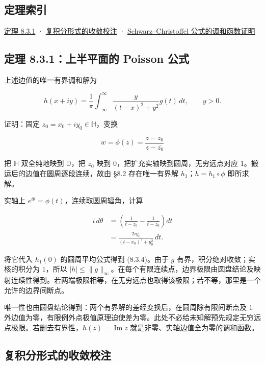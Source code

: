\documentclass[11pt,a4paper]{article}
\begin{document}
\subsection*{定理索引}\label{ch08-s3-heading-1}

\hyperref[ch08-s3-heading-2]{定理 8.3.1} ·
\hyperref[ch08-s3-heading-3]{复积分形式的收敛校注} ·
\hyperref[ch08-s3-heading-4]{Schwarz--Christoffel 公式的调和函数证明}

\subsection{定理 8.3.1：上半平面的 Poisson 公式}\label{ch08-s3-heading-2}

上述边值的唯一有界调和解为

\[
h(x+iy)=\frac1\pi\int_{-\infty}^{\infty}\frac{y}{(t-x)^2+y^2}g(t)\,dt,
\qquad y>0.\tag{8.3.4}
\]

证明：固定 \(z_0=x_0+iy_0\in\mathbb H\)，变换

\[
w=\phi(z)=\frac{z-z_0}{z-\overline{z_0}}\tag{8.3.A}
\]

把 \(\mathbb H\) 双全纯地映到 \(\mathbb D\)，把 \(z_0\) 映到
\(0\)，把扩充实轴映到圆周，无穷远点对应
\(1\)。搬运后的边值在圆周逐段连续，故由 §8.2 存在唯一有界解
\(h_1\)；\(h=h_1\circ\phi\) 即所求解。

实轴上 \(e^{i\theta}=\phi(t)\)，连续取圆周辐角，计算

\[
\begin{aligned}
i\,d\theta
&=\left(\frac1{t-z_0}-\frac1{t-\overline{z_0}}\right)dt\\
&=\frac{2iy_0}{(t-x_0)^2+y_0^2}\,dt.
\end{aligned}\tag{8.3.3}
\]

将它代入 \(h_1(0)\) 的圆周平均公式得到 (8.3.4)。由于 \(g\)
有界，积分绝对收敛；实核的积分为 \(1\)，所以
\(|h|\le\|g\|_\infty\)。在每个有限连续点，边界极限由圆盘结论及映射连续性得到。若两端极限相等，在无穷远点也取得该极限；若不等，那里是一个允许的边界间断点。

唯一性也由圆盘结论得到：两个有界解的差经变换后，在圆周除有限间断点及
\(1\)
外边值为零，有限例外点极值原理迫使差为零。此处不必给未知解预先规定无穷远点极限。若删去有界性，\(h(z)=\operatorname{Im}z\)
就是非零、实轴边值全为零的调和函数。

\subsection*{复积分形式的收敛校注}\label{ch08-s3-heading-3}
\end{document}
